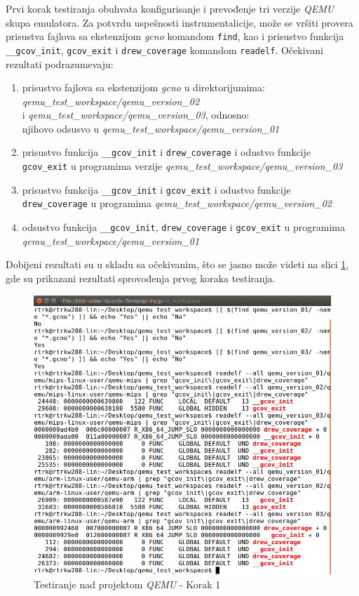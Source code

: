 \documentclass[12pt,oneside]{memoir}
\newcommand{\kod}[1]{\texttt{#1}}
\newcommand{\strano}[1]{\textit{#1}}
\begin{document}
Prvi korak testiranja obuhvata konfigurisanje i prevođenje tri verzije \strano{QEMU} skupa emulatora. Za  potvrdu uspešnosti instrumentalicije, može se vršiti provera prisustva fajlova sa ekstenzijom \strano{gcno} komandom \kod{find}, kao i prisustvo funkcija  \kod{\_\_gcov\_init}, \kod{gcov\_exit} i \kod{drew\_coverage} komandom \kod{readelf}. Očekivani rezultati podrazumevaju:
\begin{enumerate}
\item prisustvo fajlova sa ekstenzijom \strano{gcno} u direktorijumima: \\ \strano{qemu\_test\_workspace/qemu\_version\_02} \\ i \strano{qemu\_test\_workspace/qemu\_version\_03}, odnosno: \\ njihovo odsusvo u \strano{qemu\_test\_workspace/qemu\_version\_01}
\item prisustvo funkcija \kod{\_\_gcov\_init} i \kod{drew\_coverage} i odustvo funkcije \kod{gcov\_exit} u programima verzije \strano{qemu\_test\_workspace/qemu\_version\_03}
\item prisustvo funkcija \kod{\_\_gcov\_init} i \kod{gcov\_exit} i odustvo funkcije \kod{drew\_coverage} u programima  \strano{qemu\_test\_workspace/qemu\_version\_02}
\item odsustvo funkcija \kod{\_\_gcov\_init}, \kod{drew\_coverage} i \kod{gcov\_exit} u programima \strano{qemu\_test\_workspace/qemu\_version\_01}
\end{enumerate}
Dobijeni rezultati su u skladu sa očekivanim, što se jasno može videti na slici \ref{fig:qemu-test-1}, gde su prikazani rezultati sprovođenja prvog koraka testiranja.  

\begin{figure}[!ht]
  \centering
  \includegraphics[width=\textwidth]{img/qemu-test-1-ng.png}
  \caption{Testiranje nad projektom \strano{QEMU} - Korak 1}
  \label{fig:qemu-test-1}
\end{figure} 
\end{document}
